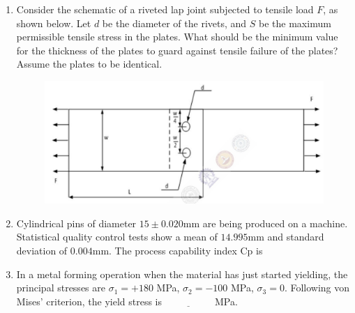 \documentclass[journal]{IEEEtran}
\begin{document}
\begin{enumerate}[leftmargin=0pt]
    \item Consider the schematic of a riveted lap joint subjected to tensile load $F$, as shown below. Let $d$ be the diameter of the rivets, and $S$ be the maximum permissible tensile stress in the plates. What should be the minimum value for the thickness of the plates to guard against tensile failure of the plates? Assume the plates to be identical.
    \begin{figure}[h]
\centering
\includegraphics[width=0.5\columnwidth]{Figs/image (23).png}
\caption*{}
\label{fig:19}
\end{figure}

    \hfill{}

    \begin{enumerate}
    \end{enumerate}

    \item Cylindrical pins of diameter $15 \pm 0.020$mm are being produced on a machine. Statistical quality control tests show a mean of $14.995$mm and standard deviation of $0.004$mm. The process capability index $\text{Cp}$ is

    \hfill{}

    \begin{enumerate}
    \end{enumerate}

    \item In a metal forming operation when the material has just started yielding, the principal stresses are $\sigma_1 = +180$ MPa, $\sigma_2 = -100$ MPa, $\sigma_3 = 0$. Following von Mises' criterion, the yield stress is $\underline{\hspace{2cm}}$ MPa.


\end{enumerate}
\end{document}
